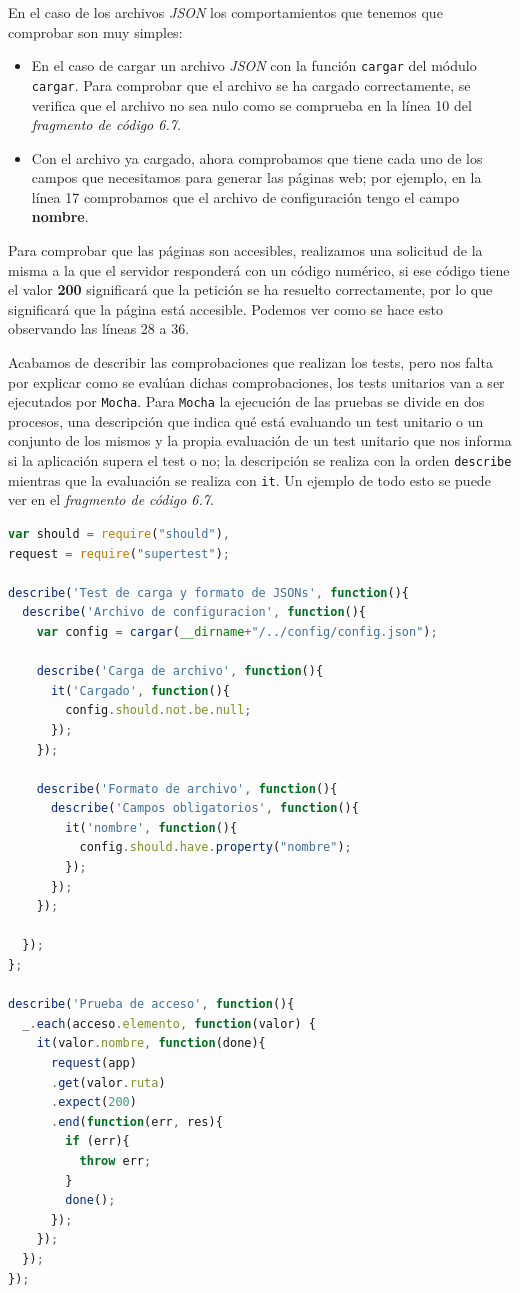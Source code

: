 \bigskip
En el caso de los archivos \textit{JSON} los comportamientos que tenemos que comprobar son muy simples:

\begin{itemize}
	\item En el caso de cargar un archivo \textit{JSON} con la función {\tt cargar} del módulo {\tt cargar}. Para comprobar que el archivo se ha cargado correctamente, se verifica que el archivo no sea nulo como se comprueba en la línea 10 del \textit{fragmento de código 6.7}.
	\item Con el archivo ya cargado, ahora comprobamos que tiene cada uno de los campos que necesitamos para generar las páginas web; por ejemplo, en la línea 17 comprobamos que el archivo de configuración tengo el campo \textbf{nombre}.
\end{itemize}

Para comprobar que las páginas son accesibles, realizamos una solicitud de la misma a la que el servidor responderá con un código numérico, si ese código tiene el valor \textbf{200} significará que la petición se ha resuelto correctamente, por lo que significará que la página está accesible. Podemos ver como se hace esto observando las líneas 28 a 36.

\bigskip

Acabamos de describir las comprobaciones que realizan los tests, pero nos falta por explicar como se evalúan dichas comprobaciones, los tests unitarios van a ser ejecutados por {\tt Mocha}. Para {\tt Mocha} la ejecución de las pruebas se divide en dos procesos, una descripción que indica qué está evaluando un test unitario o un conjunto de los mismos y la propia evaluación de un test unitario que nos informa si la aplicación supera el test o no; la descripción se realiza con la orden {\tt describe} mientras que la evaluación se realiza con {\tt it}. Un ejemplo de todo esto se puede ver en el \textit{fragmento de código 6.7}.

\newpage
\begin{lstlisting}[language=javascript,caption={Archivo test.js},label={lst:testjs}]
var should = require("should"),
request = require("supertest");

describe('Test de carga y formato de JSONs', function(){
  describe('Archivo de configuracion', function(){
    var config = cargar(__dirname+"/../config/config.json");

    describe('Carga de archivo', function(){
      it('Cargado', function(){
        config.should.not.be.null;
      });
    });

    describe('Formato de archivo', function(){
      describe('Campos obligatorios', function(){
        it('nombre', function(){
          config.should.have.property("nombre");
        });
      });
    });
    
  });
};

describe('Prueba de acceso', function(){
  _.each(acceso.elemento, function(valor) {
    it(valor.nombre, function(done){
      request(app)
      .get(valor.ruta)
      .expect(200)
      .end(function(err, res){
        if (err){
          throw err;
        }
        done();
      });
    });
  });
});
\end{lstlisting}

